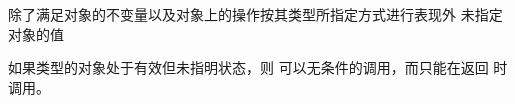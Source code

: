 除了满足对象的不变量以及对象上的操作按其类型所指定方式进行表现外
未指定对象的值

\begin{example}[\noindent]
  如果类型的对象处于有效但未指明状态，则
  可以无条件的调用，而只能在返回
  时调用。
\end{example}
